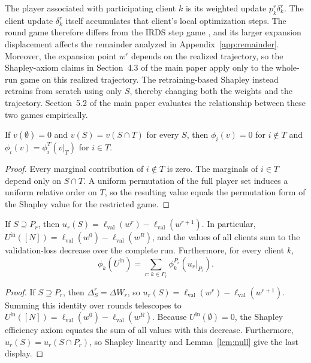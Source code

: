 \documentclass[letterpaper]{article} %
\providecommand{\lval}{\ell_{\mathrm{val}}}
\theoremstyle{definition}
\begin{document}
The player associated with participating client $k$ is its weighted update
$p_k^r\delta_k^r$. The client update $\delta_k^r$ itself accumulates that
client's local optimization steps. The round game therefore differs from the
IRDS step game \citep{wang2025data}, and its larger expansion displacement
affects the remainder analyzed in Appendix~\ref{app:remainder}. Moreover, the
expansion point $w^r$ depends on the realized trajectory, so the Shapley-axiom
claims in Section~4.3 of the main paper apply only to the whole-run game on this
realized trajectory. The retraining-based Shapley \citep{ghorbani2019data} instead
retrains from scratch using only $S$, thereby changing both the weights and the
trajectory. Section~5.2 of the main paper evaluates the relationship between
these two games empirically.

\begin{lemma}
\label{lem:null}
If $v(\emptyset) = 0$ and $v(S) = v(S \cap T)$ for every $S$, then
$\phi_i(v) = 0$ for $i \notin T$ and $\phi_i(v) = \phi_i^T(v|_T)$ for
$i \in T$.
\end{lemma}

\begin{proof}
Every marginal contribution of $i \notin T$ is zero. The marginals of
$i \in T$ depend only on $S \cap T$. A uniform permutation of the full player
set induces a uniform relative order on $T$, so the resulting value equals
the permutation form of the Shapley value for the restricted game.
\end{proof}

\begin{proposition}
\label{prop:decomp}
If $S \supseteq P_r$, then $u_r(S) = \lval(w^r) - \lval(w^{r+1})$. In
particular, $U^{\mathrm{in}}([N]) = \lval(w^0) - \lval(w^R)$, and the values
of all clients sum to the validation-loss decrease over the complete run.
Furthermore, for every client $k$,
\[
\phi_k(U^{\mathrm{in}}) = \sum_{r:\,k \in P_r} \phi_k^{P_r}(u_r|_{P_r}).
\]
\end{proposition}

\begin{proof}
If $S \supseteq P_r$, then $\Delta_S^r = \Delta W_r$, so
$u_r(S) = \lval(w^r) - \lval(w^{r+1})$. Summing this identity over rounds
telescopes to $U^{\mathrm{in}}([N]) = \lval(w^0) - \lval(w^R)$. Because
$U^{\mathrm{in}}(\emptyset) = 0$, the Shapley efficiency axiom equates the
sum of all values with this decrease. Furthermore,
$u_r(S) = u_r(S \cap P_r)$, so Shapley linearity and Lemma~\ref{lem:null}
give the last display.
\end{proof}
\end{document}
